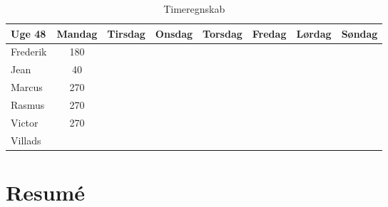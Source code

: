 \begin{table}[H]
\begin{tabular}{@{}lccccccc@{}}
\toprule
Uge 48   & Mandag & Tirsdag & Onsdag & Torsdag & Fredag & Lørdag & Søndag \\ \midrule
Frederik &  180  &    &    &    &    &    &    \\
Jean     &  40  &    &    &    &    &    &    \\
Marcus   &  270 &    &    &    &    &    &    \\
Rasmus   &  270 &    &    &    &    &    &    \\
Victor   &  270 &    &    &    &    &    &    \\
Villads  &    &    &    &    &    &    &    \\ \bottomrule
\end{tabular}
\caption{Timeregnskab}
\end {table}

\clearpage


\section*{Resumé}
\lipsum[3]
